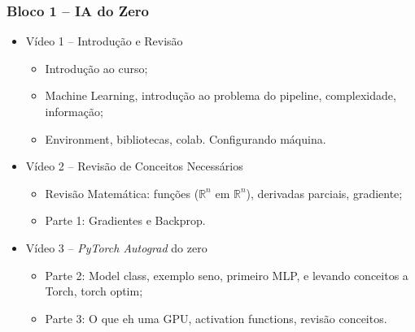 \documentclass[a4paper,12pt, brazil]{article}
\begin{document}
    \subsubsection*{Bloco 1 -- IA do Zero}
    \begin{itemize}
        \item Vídeo 1 -- Introdução e Revisão
        \begin{itemize}
            \item Introdução ao curso;
            \item Machine Learning, introdução ao problema do pipeline, complexidade, informação;
            \item Environment, bibliotecas, colab. Configurando máquina.
        \end{itemize}
    
        \item Vídeo 2 -- Revisão de Conceitos Necessários
        \begin{itemize}
            \item Revisão Matemática: funções ($\mathbb{R}^n$ em $\mathbb{R}^n$), derivadas parciais, gradiente;
            \item Parte 1: Gradientes e Backprop.
        \end{itemize}
            
        \item Vídeo 3 -- \emph{PyTorch Autograd} do zero
            \begin{itemize}
                \item Parte 2: Model class, exemplo seno, primeiro MLP, e levando conceitos a Torch, torch optim;
                \item Parte 3: O que eh uma GPU, activation functions, revisão conceitos.
            \end{itemize} 
    \end{itemize}
    
\end{document}
